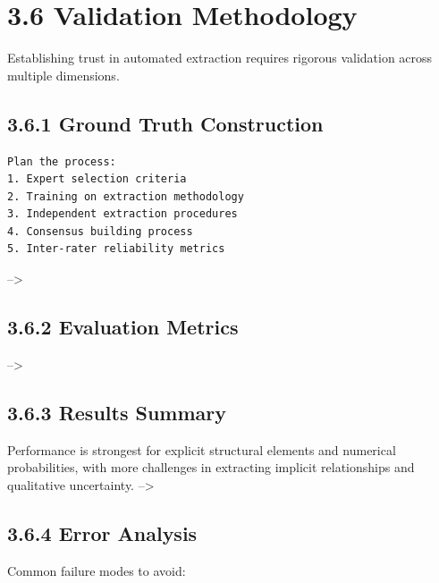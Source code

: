 \documentclass[
  11pt,
  letterpaper,
]{book}
\begin{document}
\section*{3.6 Validation Methodology}\label{sec-validation-methodology}


Establishing trust in automated extraction requires rigorous validation
across multiple dimensions.

\subsection*{3.6.1 Ground Truth Construction}\label{sec-ground-truth}

\begin{verbatim}
Plan the process:
1. Expert selection criteria
2. Training on extraction methodology
3. Independent extraction procedures
4. Consensus building process
5. Inter-rater reliability metrics
\end{verbatim}

--\textgreater{}

\subsection*{3.6.2 Evaluation Metrics}\label{sec-evaluation-metrics}

--\textgreater{}

\subsection*{3.6.3 Results Summary}\label{sec-validation-results}

Performance is strongest for explicit structural elements and numerical
probabilities, with more challenges in extracting implicit relationships
and qualitative uncertainty. --\textgreater{}

\subsection*{3.6.4 Error Analysis}\label{sec-error-analysis}

Common failure modes to avoid:
\end{document}
